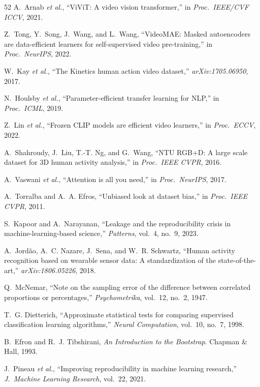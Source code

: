 \documentclass[journal]{IEEEtran}
\begin{document}
\begin{thebibliography}{52}
 A.~Arnab \emph{et al.}, ``ViViT: A video vision
transformer,'' in \emph{Proc.\ IEEE/CVF ICCV}, 2021.

 Z.~Tong, Y.~Song, J.~Wang, and L.~Wang,
``VideoMAE: Masked autoencoders are data-efficient learners for
self-supervised video pre-training,'' in \emph{Proc.\ NeurIPS}, 2022.

 W.~Kay \emph{et al.}, ``The Kinetics human action
video dataset,'' \emph{arXiv:1705.06950}, 2017.

 N.~Houlsby \emph{et al.},
``Parameter-efficient transfer learning for NLP,'' in \emph{Proc.\ ICML},
2019.

 Z.~Lin \emph{et al.}, ``Frozen CLIP models are
efficient video learners,'' in \emph{Proc.\ ECCV}, 2022.

 A.~Shahroudy, J.~Liu, T.-T. Ng, and G.~Wang,
``NTU RGB+D: A large scale dataset for 3D human activity analysis,'' in
\emph{Proc.\ IEEE CVPR}, 2016.

 A.~Vaswani \emph{et al.}, ``Attention is all
you need,'' in \emph{Proc.\ NeurIPS}, 2017.

 A.~Torralba and A.~A. Efros, ``Unbiased look at
dataset bias,'' in \emph{Proc.\ IEEE CVPR}, 2011.

 S.~Kapoor and A.~Narayanan, ``Leakage and the
reproducibility crisis in machine-learning-based science,''
\emph{Patterns}, vol.~4, no.~9, 2023.

 A.~Jord\~ao, A.~C. Nazare, J.~Sena, and
W.~R. Schwartz, ``Human activity recognition based on wearable sensor
data: A standardization of the state-of-the-art,'' \emph{arXiv:1806.05226},
2018.

 Q.~McNemar, ``Note on the sampling error of the
difference between correlated proportions or percentages,''
\emph{Psychometrika}, vol.~12, no.~2, 1947.

 T.~G. Dietterich, ``Approximate statistical tests
for comparing supervised classification learning algorithms,''
\emph{Neural Computation}, vol.~10, no.~7, 1998.

 B.~Efron and R.~J. Tibshirani, \emph{An
Introduction to the Bootstrap}.  Chapman \& Hall, 1993.

 J.~Pineau \emph{et al.}, ``Improving
reproducibility in machine learning research,'' \emph{J.\ Machine Learning
Research}, vol.~22, 2021.


\end{thebibliography}
\end{document}
